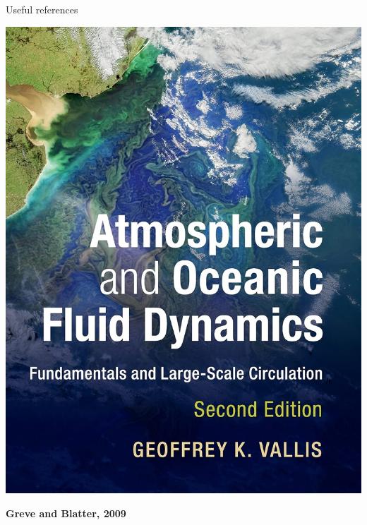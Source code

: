 \documentclass[aspectratio=169,xcolor=dvipsnames]{beamer}
\begin{document}
\begin{frame}{Useful references}
\begin{center}
\begin{minipage}{0.2\textwidth}
\begin{center}
\includegraphics[width=1\textwidth]{figs/Fig-Book-Vallis-2017.jpg}
\end{center}
\end{minipage}
\hspace{1em}
\begin{minipage}{0.2\textwidth}
\begin{center}
\textbf{Greve and Blatter, 2009}

\vspace{1em}


\end{center}
\end{minipage}
\end{center}
\end{frame}
\end{document}
